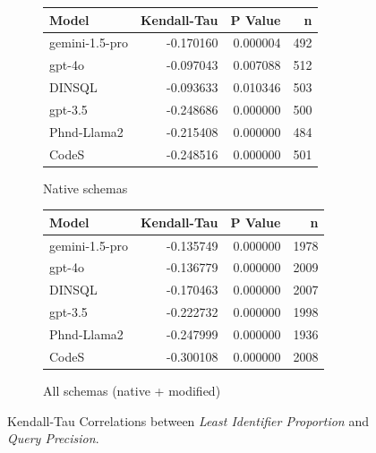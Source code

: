 \begin{figure}
  \centering
  \begin{subfigure}{.5\linewidth}
      \centering
      \begin{tabular}{lrrr}
\toprule
Model & Kendall-Tau & P Value & n \\
\midrule
gemini-1.5-pro & -0.170160 & 0.000004 & 492 \\
gpt-4o & -0.097043 & 0.007088 & 512 \\
DINSQL & -0.093633 & 0.010346 & 503 \\
gpt-3.5 & -0.248686 & 0.000000 & 500 \\
Phnd-Llama2 & -0.215408 & 0.000000 & 484 \\
CodeS & -0.248516 & 0.000000 & 501 \\
\bottomrule
\end{tabular}

      \caption{Native schemas}
      \label{table:natlow-precision-ktau-native}
  \end{subfigure}%
  \begin{subfigure}{.5\linewidth}
      \centering
      \begin{tabular}{lrrr}
\toprule
Model & Kendall-Tau & P Value & n \\
\midrule
gemini-1.5-pro & -0.135749 & 0.000000 & 1978 \\
gpt-4o & -0.136779 & 0.000000 & 2009 \\
DINSQL & -0.170463 & 0.000000 & 2007 \\
gpt-3.5 & -0.222732 & 0.000000 & 1998 \\
Phnd-Llama2 & -0.247999 & 0.000000 & 1936 \\
CodeS & -0.300108 & 0.000000 & 2008 \\
\bottomrule
\end{tabular}

      \caption{All schemas (native + modified)}
      \label{table:natlow-precision-ktau-all}
  \end{subfigure}
  \caption{Kendall-Tau Correlations between \emph{Least Identifier Proportion} and \emph{Query Precision}.}
\end{figure}


